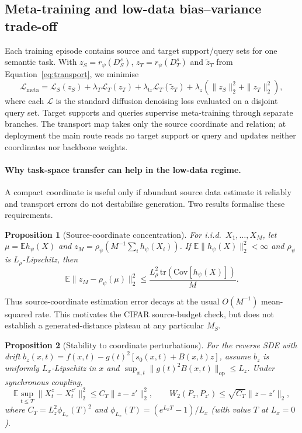 \documentclass{article}
\newtheorem{proposition}{Proposition}
\newcommand{\E}{\mathbb{E}}
\newcommand{\MS}{M_S}
\begin{document}
\subsection{Meta-training and low-data bias--variance trade-off}
Each training episode contains source and target support/query sets for one semantic task. With $z_S=r_\psi(D_S^s)$, $z_T=r_\psi(D_T^s)$ and $\widetilde z_T$ from Equation~\eqref{eq:transport}, we minimise
\begin{equation}
\mathcal{L}_{\mathrm{meta}}=\mathcal{L}_{S}(z_S)+\lambda_T\mathcal{L}_{T}(z_T)+\lambda_{\mathrm{tr}}\mathcal{L}_{T}(\widetilde z_T)+\lambda_z(\|z_S\|_2^2+\|z_T\|_2^2),
\label{eq:meta}
\end{equation}
where each $\mathcal{L}$ is the standard diffusion denoising loss evaluated on a disjoint query set. Target supports and queries supervise meta-training through separate branches. The transport map takes only the source coordinate and relation; at deployment the main route reads no target support or query and updates neither coordinates nor backbone weights.

\paragraph{Why task-space transfer can help in the low-data regime.}
A compact coordinate is useful only if abundant source data estimate it reliably and transport errors do not destabilise generation. Two results formalise these requirements.

\begin{proposition}[Source-coordinate concentration]
\label{prop:source-concentration}
For i.i.d.\ $X_1,\ldots,X_M$, let $\mu=\E h_\psi(X)$ and
$z_M=\rho_\psi(M^{-1}\sum_i h_\psi(X_i))$. If
$\E\|h_\psi(X)\|_2^2<\infty$ and $\rho_\psi$ is $L_\rho$-Lipschitz, then
\[
\E\|z_M-\rho_\psi(\mu)\|_2^2
\leq
\frac{L_\rho^2\,\mathrm{tr}(\mathrm{Cov}[h_\psi(X)])}{M}.
\]
\end{proposition}

Thus source-coordinate estimation error decays at the usual $O(M^{-1})$ mean-squared rate. This motivates the CIFAR source-budget check, but does not establish a generated-distance plateau at any particular $\MS$.

\begin{proposition}[Stability to coordinate perturbations]
\label{prop:coordinate-stability}
For the reverse SDE with drift
$b_z(x,t)=f(x,t)-g(t)^2[s_0(x,t)+B(x,t)z]$, assume $b_z$ is uniformly
$L_x$-Lipschitz in $x$ and
$\sup_{x,t}\|g(t)^2B(x,t)\|_{\mathrm{op}}\leq L_z$. Under synchronous coupling,
\[
\E\sup_{t\leq T}\|X_t^z-X_t^{z'}\|_2^2
\leq C_T\|z-z'\|_2^2,
\qquad
W_2(P_z,P_{z'})\leq\sqrt{C_T}\|z-z'\|_2,
\]
where $C_T=L_z^2\phi_{L_x}(T)^2$ and
$\phi_{L_x}(T)=(e^{L_xT}-1)/L_x$ (with value $T$ at $L_x=0$).
\end{proposition}
\end{document}

